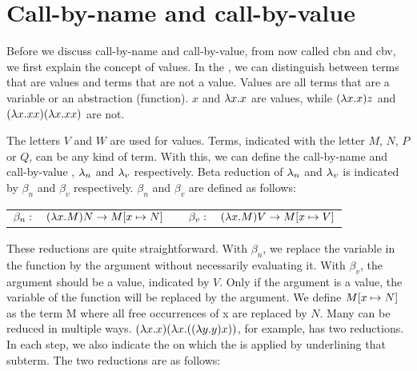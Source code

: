 
\section{Call-by-name and call-by-value}
Before we discuss call-by-name and call-by-value, from now called cbn and cbv, we first explain the concept of values.
In the \lc, we can distinguish between terms that are values and terms that are not a value.
Values are all terms that are a variable or an abstraction (function).
$x$ and $\lambda x. x$ are values, while $(\lambda x. x)z$ and $(\lambda x. xx) (\lambda x. xx)$ are not.

The letters $V$ and $W$ are used for values.
Terms, indicated with the letter $M$, $N$, $P$ or $Q$, can be any kind of term.
With this, we can define the call-by-name \lc and call-by-value \lc, $\lambda_n$ and $\lambda_v$ respectively.
Beta reduction of $\lambda_n$ and $\lambda_v$ is indicated by $\beta_n$ and $\beta_v$ respectively.
$\beta_n$ and $\beta_v$ are defined as follows:

\vspace{10pt}
\begin{tabular}{c c}
	$\beta_n: \quad (\lambda x.M) N \rightarrow M[{x}\mapsto{N}]$ &
	$\quad \beta_v: \quad (\lambda x.M) V \rightarrow M[{x}\mapsto{V}]$
\end{tabular}

These reductions are quite straightforward. With $\beta_n$, we replace the variable in the function by the argument without necessarily evaluating it.
With $\beta_v$, the argument should be a value, indicated by $V$. Only if the argument is a value, the variable of the function will be replaced by the argument.
We define $M[{x}\mapsto{N}]$ as the term M where all free occurrences of x are replaced by $N$.
\vspace{10pt}
Many \lterms can be reduced in multiple ways. $(\lambda x. x)(\lambda x. ((\lambda y. y) x))$, for example, has two reductions.
In each \br step, we also indicate the \bre on which the \br is applied by underlining that subterm. The two reductions are as follows:

